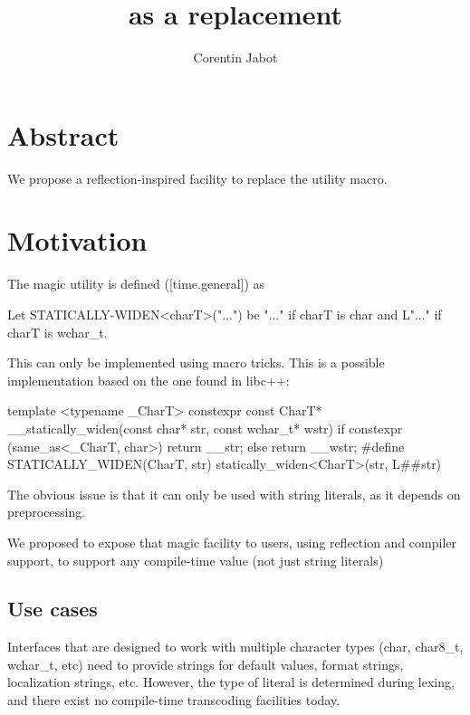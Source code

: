 \documentclass{wg21}
\title{\tcode{define\_static\_string} as a \tcode{STATICALLY\_WIDEN} replacement}
\author{Corentin Jabot}{corentin.jabot@gmail.com}
\begin{document}
\maketitle

\section{Abstract}

We propose a reflection-inspired facility to replace the  utility macro.


\section{Motivation}


The  magic utility is defined ([time.general]) as

\begin{colorblock}
Let STATICALLY-WIDEN<charT>("...") be "..." if charT is char and L"..." if charT is wchar_t.
\end{colorblock}

This can only be implemented using macro tricks.
This is a possible implementation based on the one found in libc++:

\begin{colorblock}
template <typename _CharT>
constexpr const CharT* __statically_widen(const char* str, const wchar_t* wstr) {
    if constexpr (same_as<_CharT, char>)
      return __str;
    else
      return __wstr;
}
#define STATICALLY_WIDEN(CharT, str) statically_widen<CharT>(str, L##str)
\end{colorblock}

The obvious issue is that it can only be used with string literals, as it depends on preprocessing.

We proposed to expose that magic facility to users, using reflection and compiler support, to support any compile-time value (not just string literals)

\subsection{Use cases}

Interfaces that are designed to work with multiple character types (char, char8_t, wchar_t, etc) need to provide strings for default values,
format strings, localization strings, etc. However, the type of literal is determined during lexing, and there exist no compile-time transcoding
facilities today.
\end{document}
